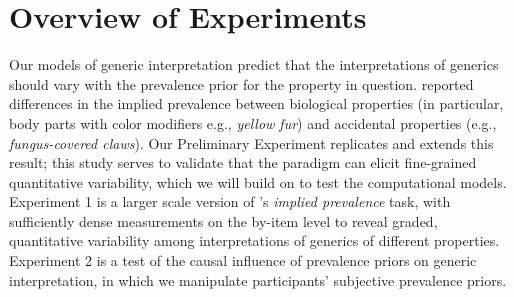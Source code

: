 \documentclass[floatsintext,doc]{apa6}
\begin{document}






\hypertarget{overview-of-experiments}{%
\section{Overview of Experiments}\label{overview-of-experiments}}

Our models of generic interpretation predict that the interpretations of generics should vary with the prevalence prior for the property in question.
 reported differences in the implied prevalence between biological properties (in particular, body parts with color modifiers e.g., \emph{yellow fur}) and accidental properties (e.g., \emph{fungus-covered claws}).
Our Preliminary Experiment replicates and extends this result; this study serves to validate that the paradigm can elicit fine-grained quantitative variability, which we will build on to test the computational models.
Experiment 1 is a larger scale version of 's \emph{implied prevalence} task, with sufficiently dense measurements on the by-item level to reveal graded, quantitative variability among interpretations of generics of different properties. 
Experiment 2 is a test of the causal influence of prevalence priors on generic interpretation, in which we manipulate participants' subjective prevalence priors.
\end{document}
